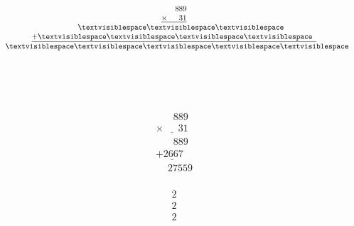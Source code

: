 \begin{minipage}[t]{0.3\linewidth}
\begin{align*}\begin{array}{c}
\phantom{
\times00
}
889\\
\underline{
\times
\phantom{
000
}
31
}\\
\phantom{
+00
}
\textvisiblespace
\textvisiblespace
\textvisiblespace
\\
\underline{
+
\textvisiblespace
\textvisiblespace
\textvisiblespace
\textvisiblespace
\phantom0
}
\\
\phantom{+}
\textvisiblespace
\textvisiblespace
\textvisiblespace
\textvisiblespace
\textvisiblespace
\end{array}\end{align*}
\end{minipage}
\begin{minipage}[t]{0.05\linewidth}
\begin{align*}\begin{array}{c}
\textvisiblespace
\\
\textvisiblespace
\\
\textvisiblespace
\end{array}\end{align*}
\end{minipage}
\begin{minipage}[t]{0.3\linewidth}
\begin{align*}\begin{array}{c}
\phantom{
\times00
}
889\\
\underline{
\times
\phantom{
000
}
31
}\\
\phantom{
+00
}
889
\\
\underline{
+
2667
\phantom0
}
\\
\phantom{+}
27559
\end{array}\end{align*}
\end{minipage}
\begin{minipage}[t]{0.05\linewidth}
\begin{align*}\begin{array}{c}
2
\\
2
\\
2
\end{array}\end{align*}
\end{minipage}

